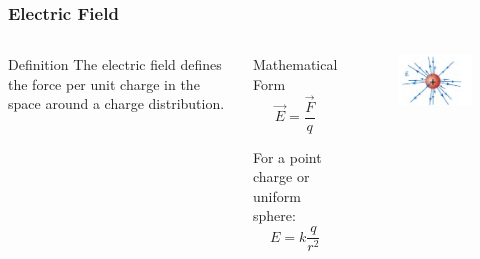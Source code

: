 \documentclass{beamer}
\begin{document}
\begin{frame}
    \frametitle{Electric Field}
    \begin{columns}
        \begin{block}{Definition}
            The electric field defines the force per unit charge in the space around a charge distribution.
        \end{block}
        
        \begin{block}{Mathematical Form}
            \begin{equation}
                \vec{E} = \frac{\vec{F}}{q}
            \end{equation}
            
            For a point charge or uniform sphere:
            \begin{equation}
                E = k\frac{q}{r^2}
            \end{equation}
        \end{block}
        
        \begin{alertblock}{ }
            \begin{figure}
                \centering
                \includegraphics[width=0.75\linewidth]{posefeild.png}
            \end{figure}
        \end{alertblock}
    \end{columns}
\end{frame}
\end{document}
